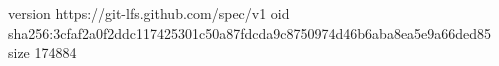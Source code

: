 version https://git-lfs.github.com/spec/v1
oid sha256:3cfaf2a0f2ddc117425301c50a87fdcda9c8750974d46b6aba8ea5e9a66ded85
size 174884
